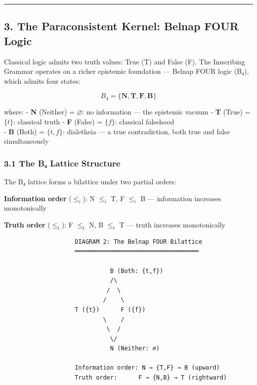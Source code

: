 \documentclass[12pt,a4paper]{article}
\begin{document}
\begin{center}\rule{0.5\linewidth}{0.5pt}\end{center}

\hypertarget{the-paraconsistent-kernel-belnap-four-logic}{%
\subsection{3. The Paraconsistent Kernel: Belnap FOUR
Logic}\label{the-paraconsistent-kernel-belnap-four-logic}}

Classical logic admits two truth values: True (T) and False (F). The
Imscribing Grammar operates on a richer epistemic foundation --- Belnap
FOUR logic (B₄), which admits four states:

\[B_4 = \{\mathbf{N}, \mathbf{T}, \mathbf{F}, \mathbf{B}\}\]

where: - \textbf{N} (Neither) = \(\varnothing\): no information --- the
epistemic vacuum - \textbf{T} (True) = \(\{t\}\): classical truth -
\textbf{F} (False) = \(\{f\}\): classical falsehood\\
- \textbf{B} (Both) = \(\{t, f\}\): dialetheia --- a true contradiction,
both true and false simultaneously

\hypertarget{the-bux2084-lattice-structure}{%
\subsubsection{3.1 The B₄ Lattice
Structure}\label{the-bux2084-lattice-structure}}

The B₄ lattice forms a bilattice under two partial orders:

\textbf{Information order} (\(\leq_i\)): N \(\leq_i\) T, F \(\leq_i\) B
--- information increases monotonically

\textbf{Truth order} (\(\leq_t\)): F \(\leq_t\) N, B \(\leq_t\) T ---
truth increases monotonically

\begin{verbatim}
                    DIAGRAM 2: The Belnap FOUR Bilattice
                    ═══════════════════════════════════

                              B (Both: {t,f})
                              /\
                             /  \
                            /    \
                    T ({t})      F ({f})
                            \    /
                             \  /
                              \/
                              N (Neither: ∅)

                    Information order: N → {T,F} → B (upward)
                    Truth order:      F → {N,B} → T (rightward)
\end{verbatim}
\end{document}
